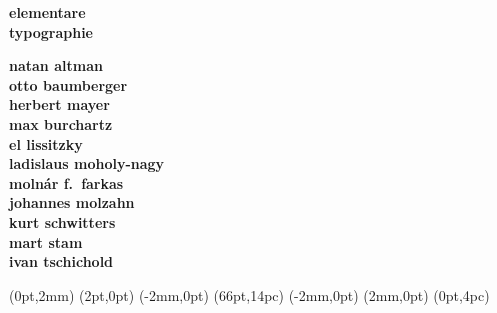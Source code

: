 \documentclass{article}
\begin{document}
  \newcoffin \result
  \newcoffin \aaa
  \newcoffin \bbb
  \newcoffin \ccc
  \newcoffin \ddd
  \newcoffin \eee
  \newcoffin \fff
  \newcoffin {}
  \newcoffin {}
  \newcoffin {}

\sbox \result {}
\sbox {}
\sbox {}
\sbox {}
\sbox {}
\setvcoffin \eee {180pt}
                 {\raggedleft\fontsize{31}{36}\sffamily\bfseries 
                      elementare\\
                      typographie}
\setvcoffin \fff {140pt}
                 {\raggedright \fontsize{13}{14}\sffamily\bfseries 
                       natan altman \\
                       otto baumberger \\
                       herbert mayer \\
                       max burchartz \\
                       el lissitzky \\
                       ladislaus moholy-nagy \\
                       moln\'ar f.~farkas \\
                       johannes molzahn \\
                       kurt schwitters \\
                       mart stam \\
                       ivan tschichold}
     
\rotatecoffin {}
\rotatecoffin {}

\sbox {}
\sbox {}
\sbox {}


\aligncoffins \result                \aaa
\aligncoffins {} (0pt,2mm)
\aligncoffins {} \bbb[B,r](2pt,0pt)
\aligncoffins {} (-2mm,0pt)
\aligncoffins {} \ccc[B,l](66pt,14pc)
\aligncoffins {} \fff[t,r](-2mm,0pt)
\aligncoffins {} (2mm,0pt)
\aligncoffins {} \eee[B,r]
\aligncoffins {} \ddd[B,r](0pt,4pc)
\end{document}

